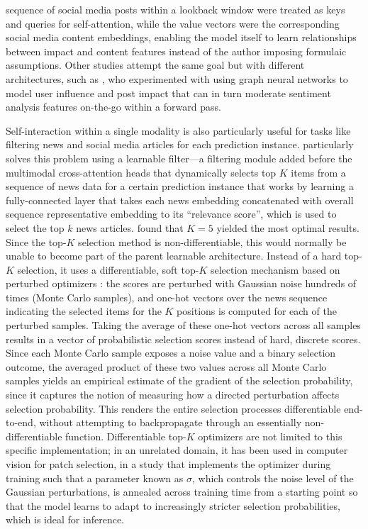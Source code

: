 \documentclass[stu,floatsintext]{apa7}
\begin{document}
sequence of social media posts within a lookback window were treated as keys and queries for self-attention, while the value vectors were the corresponding social media content embeddings, enabling the model itself to learn relationships between impact and content features instead of the author imposing formulaic assumptions. Other studies attempt the same goal but with different architectures, such as \textcite{zhangp2025gnnbased}, who experimented with using graph neural networks to model user influence and post impact that can in turn moderate sentiment analysis features on-the-go within a forward pass.

Self-interaction within a single modality is also particularly useful for tasks like filtering news and social media articles for each prediction instance. \textcite{jang2025selective} particularly solves this problem using a learnable filter—a filtering module added before the multimodal cross-attention heads that dynamically selects top $K$ items from a sequence of news data for a certain prediction instance that works by learning a fully-connected layer that takes each news embedding concatenated with overall sequence representative embedding to its ``relevance score'', which is used to select the top $k$ news articles. \textcite{jang2025selective} found that $K=5$ yielded the most optimal results. Since the top-$K$ selection method is non-differentiable, this would normally be unable to become part of the parent learnable architecture. Instead of a hard top-$K$ selection, it uses a differentiable, soft top-$K$ selection mechanism based on perturbed optimizers \parencite{berthet2020learning}: the scores are perturbed with Gaussian noise hundreds of times (Monte Carlo samples), and one-hot vectors over the news sequence indicating the selected items for the $K$ positions is computed for each of the perturbed samples. Taking the average of these one-hot vectors across all samples results in a vector of probabilistic selection scores instead of hard, discrete scores. Since each Monte Carlo sample exposes a noise value and a binary selection outcome, the averaged product of these two values across all Monte Carlo samples yields an empirical estimate of the gradient of the selection probability, since it captures the notion of measuring how a directed perturbation affects selection probability. This renders the entire selection processes differentiable end-to-end, without attempting to backpropagate through an essentially non-differentiable function. Differentiable top-$K$ optimizers are not limited to this specific implementation; in an unrelated domain, it has been used in computer vision for patch selection, in a study \parencite{cordonnier2021differentiable} that implements the optimizer during training such that a parameter known as $\sigma$, which controls the noise level of the Gaussian perturbations, is annealed across training time from a starting point so that the model learns to adapt to increasingly stricter selection probabilities, which is ideal for inference.
\end{document}
